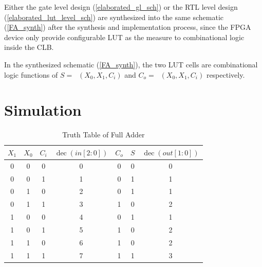 \documentclass[conference]{IEEEtran}
\begin{document}
Either the gate level design (\ref{elaborated_gl_sch}) or the RTL level design (\ref{elaborated_lut_level_sch}) are synthesized into the same schematic (\ref{FA_synth}) after the synthesis and implementation process, since the FPGA device only provide configurable LUT as the measure to combinational logic inside the CLB.

In the synthesized schematic (\ref{FA_synth}), the two LUT cells are combinational logic functions of \(S=\mathop{\mathrm{LUT_1}}(X_0,X_1,C_i)\) and \(C_o=\mathop{\mathrm{LUT_2}}(X_0,X_1,C_i)\) respectively.

\section{Simulation}

\begin{table}
	\begin{center}
		\begin{tabular}[htb]{ccccccc}
			\toprule
			\(X_1\) & \(X_0\) & \(C_i\) & \(\mathop{\mathrm{dec}}(in[2:0])\) & \(C_o\) & \(S\) & \(\mathop{\mathrm{dec}}(out[1:0])\) \\
			\midrule
			0       & 0       & 0       & 0                                  & 0       & 0     & 0                                   \\
			0       & 0       & 1       & 1                                  & 0       & 1     & 1                                   \\
			0       & 1       & 0       & 2                                  & 0       & 1     & 1                                   \\
			0       & 1       & 1       & 3                                  & 1       & 0     & 2                                   \\
			1       & 0       & 0       & 4                                  & 0       & 1     & 1                                   \\
			1       & 0       & 1       & 5                                  & 1       & 0     & 2                                   \\
			1       & 1       & 0       & 6                                  & 1       & 0     & 2                                   \\
			1       & 1       & 1       & 7                                  & 1       & 1     & 3                                   \\
			\bottomrule
		\end{tabular}
		\caption{Truth Table of Full Adder}
		\label{tt_fa}
	\end{center}
\end{table}
\end{document}

